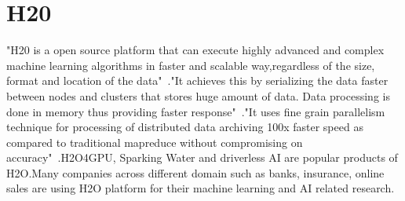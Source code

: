 \section{H20}


"H20 is a open source platform that can execute highly advanced 
and complex machine learning algorithms in faster and scalable 
way,regardless of the size, format and location of the 
data"~\cite{hid-sp18-523-www-h2o}."It achieves this by serializing 
the data faster between nodes and clusters that stores huge amount 
of data. Data processing is done in memory thus providing faster 
response"~\cite{hid-sp18-523-www-h2o}."It uses fine grain parallelism 
technique for processing of distributed data archiving 100x faster 
speed as compared to traditional mapreduce without compromising 
on accuracy"~\cite{hid-sp18-523-www-h2o}.H2O4GPU, Sparking Water
and driverless AI are popular products of H2O.Many companies
across different domain such as banks, insurance, online sales 
are using H2O platform for their machine learning and AI related
research.





